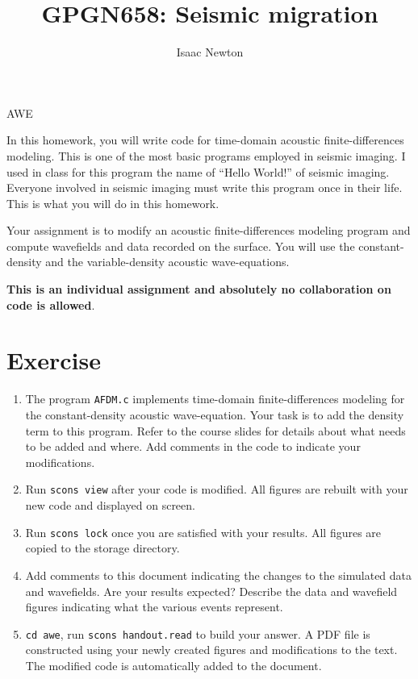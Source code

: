 \author{Isaac Newton}
\title{GPGN658: Seismic migration}{AWE}

In this homework, you will write code for time-domain acoustic
finite-differences modeling. This is one of the most basic programs
employed in seismic imaging. I used in class for this program the name
of ``Hello World!'' of seismic imaging. Everyone involved in seismic
imaging must write this program once in their life. This is what you
will do in this homework.

Your assignment is to modify an acoustic finite-differences modeling
program and compute wavefields and data recorded on the surface. You
will use the constant-density and the variable-density acoustic
wave-equations.

\textbf{This is an individual assignment and absolutely no
  collaboration on code is allowed}.


\section{Exercise}

\begin{enumerate}
\item The program \texttt{AFDM.c} implements time-domain
  finite-differences modeling for the constant-density acoustic
  wave-equation. Your task is to add the density term to this
  program. Refer to the course slides for details about what needs to
  be added and where. Add comments in the code to indicate your
  modifications.

\item Run \texttt{scons view} after your code is modified. All figures
  are rebuilt with your new code and displayed on screen.

\item Run \texttt{scons lock} once you are satisfied with your
  results. All figures are copied to the storage directory.

\item Add comments to this document indicating the changes to the
  simulated data and wavefields. Are your results expected? Describe
  the data and wavefield figures indicating what the various events
  represent.

\item \texttt{cd awe}, run \texttt{scons handout.read} to build your
  answer. A PDF file is constructed using your newly created figures
  and modifications to the text. The modified code is automatically
  added to the document.

\end{enumerate}

